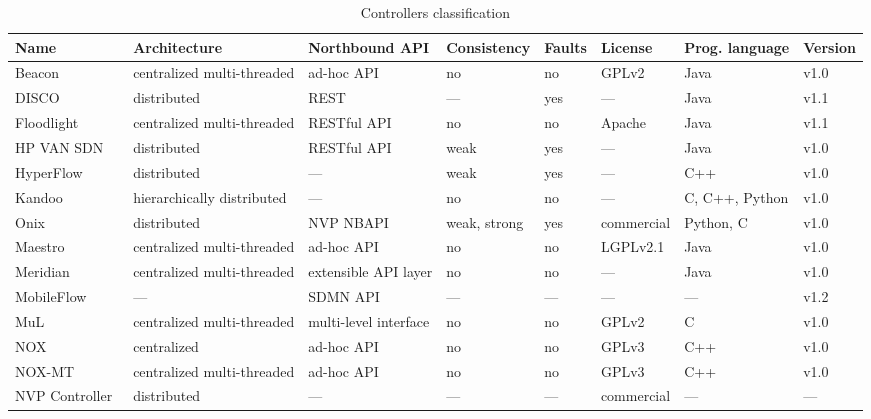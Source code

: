{\renewcommand{\arraystretch}{1.4}
\begin{table}[!htp]
\caption{Controllers classification}
\label{tab:controllers}
\begin{center}
\footnotesize
\begin{tabularx}{\linewidth}{p{2.94cm}Xp{2.29cm}p{1.47cm}p{0.75cm}p{1.35cm}p{2.1cm}p{0.9cm}}
\hline
\textbf{Name} & \textbf{Architecture} & \textbf{Northbound API} & \textbf{Consistency} & \textbf{Faults} & \textbf{License} & \textbf{Prog. language} & \textbf{Version}\\\hline
Beacon~\cite{erickson2013}     & centralized multi-threaded  & ad-hoc API & no & no & GPLv2 & Java & v1.0 \\\hline
DISCO~\cite{phemius2013} & distributed & REST & --- & yes & --- & Java & v1.1\\\hline
Floodlight~\cite{openflowhub.org2012} & centralized multi-threaded  & RESTful API & no & no & Apache & Java & v1.1 \\\hline
HP VAN SDN~\cite{hp2013-1} & distributed & RESTful API & weak & yes & --- & Java & v1.0 \\\hline
HyperFlow~\cite{tootoonchian2010}  & distributed               & --- & weak & yes & --- & C++ & v1.0 \\\hline
Kandoo~\cite{yeganeh2012}     & hierarchically distributed & --- & no & no & --- & C, C++, Python & v1.0 \\\hline
Onix~\cite{koponen-1}       & distributed               & NVP NBAPI   & weak, strong & yes & commercial & Python, C & v1.0 \\\hline
Maestro~\cite{cai2011}    & centralized multi-threaded  & ad-hoc API & no & no & LGPLv2.1 & Java & v1.0 \\\hline
Meridian~\cite{banikazemi2013} & centralized multi-threaded & extensible API layer & no & no & --- & Java & v1.0\\\hline
MobileFlow~\cite{pentikousis2013} & --- & SDMN API & --- & --- & --- & --- & v1.2 \\\hline
MuL~\cite{Saikia:2013:MuL}        & centralized multi-threaded  & multi-level interface & no & no & GPLv2 & C & v1.0 \\\hline
NOX~\cite{gude2008}       & centralized               & ad-hoc API  & no & no & GPLv3 & C++ & v1.0 \\\hline
NOX-MT~\cite{tootoonchian2012}     & centralized multi-threaded  & ad-hoc API & no & no & GPLv3 & C++ & v1.0 \\\hline
NVP Controller~\cite{koponen} & distributed & --- & --- & --- & commercial & --- & --- \\\hline

\end{tabularx}
\end{center}
\end{table}}
